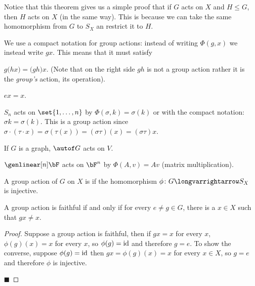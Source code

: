 \documentclass[10pt]{article}
\begin{document}
Notice that this theorem gives us a simple proof that if $G$ acts on $X$ and $H\leq G$, then $H$ acts on $X$ (in the same way).
This is because we can take the same homomorphism from $G$ to $S_X$ an restrict it to $H$.

We use a compact notation for group actions: instead of writing $\Phi(g,x)$ we instead write $gx$.
This means that it must satisfy
\benum
    \item $g\bigl(hx\bigr)=\bigl(gh\bigr)x$. (Note that on the right side $gh$ is not a group action rather it is the \emph{group's} action, its operation).
    \item $ex=x$.
\eenum

\begin{exam}

    \benum
        \item $S_n$ acts on $\set{1,\dots,n}$ by $\Phi(\sigma, k)=\sigma(k)$ or with the compact notation: $\sigma k=\sigma(k)$.
        This is a group action since $\sigma\cdot(\tau\cdot x)=\sigma(\tau(x))=(\sigma\tau)(x)=(\sigma\tau)x$.
        \item If $G$ is a graph, $\autof G$ acts on $V$.
        \item $\genlinear[n]\bF$ acts on $\bF^n$ by $\Phi(A,v)=Av$ (matrix multiplication).
    \eenum

\end{exam}

\begin{defn*}

    A group action of $G$ on $X$ is  if the homomorphism $\phi\colon G\longvarrightarrow S_X$ is injective.

\end{defn*}

\begin{prop*}

    A group action is faithful if and only if for every $e\neq g\in G$, there is a $x\in X$ such that $gx\neq x$.

\end{prop*}

\begin{proof}

    Suppose a group action is faithful, then if $gx=x$ for every $x$, $\phi(g)(x)=x$ for every $x$, so $\phi(g)={\rm id}$ and therefore $g=e$.
    To show the converse, suppose $\phi(g)={\rm id}$ then $gx=\phi(g)(x)=x$ for every $x\in X$, so $g=e$ and therefore $\phi$ is injective. 

    \hfill$\blacksquare$

\end{proof}
\end{document}
